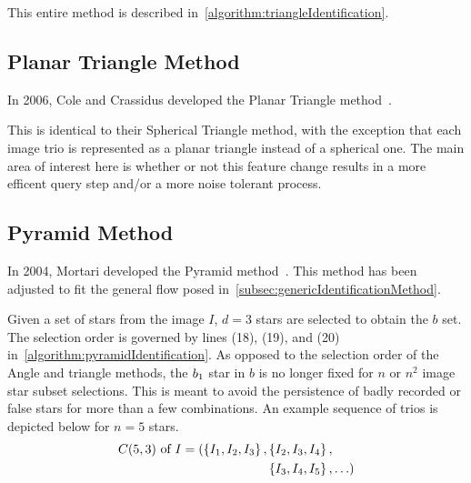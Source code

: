 This entire method is described in~\autoref{algorithm:triangleIdentification}.

\subsection{Planar Triangle Method}\label{subsec:coleAndCrassidus'sPlanarTriangleMethod}
In 2006, Cole and Crassidus developed the Planar Triangle method~\cite{Planar}.

This is identical to their Spherical Triangle method, with the exception that each image trio is represented as a
planar triangle instead of a spherical one.
The main area of interest here is whether or not this feature change results in a more efficent query step and/or
a more noise tolerant process.

\subsection{Pyramid Method}\label{subsec:pyramidMethod}
In 2004, Mortari developed the Pyramid method~\cite{Pyramid,AnalysisUncompensated}.
This method has been adjusted to fit the general flow posed in~\autoref{subsec:genericIdentificationMethod}.

Given a set of stars from the image $I$, $d = 3$ stars are selected to obtain the $b$ set.
The selection order is governed by lines (18), (19), and (20) in~\autoref{algorithm:pyramidIdentification}.
As opposed to the selection order of the Angle and triangle methods, the $b_1$ star in $b$ is no longer fixed
for $n$ or $n^2$ image star subset selections.
This is meant to avoid the persistence of badly recorded or false stars for more than a few combinations.
An example sequence of trios is depicted below for $n = 5$ stars.
\begin{equation}
    \begin{aligned}
        C(5, 3) \text{ of } I = ( \left\{ I_1, I_2, I_3 \right\}, &\left\{ I_2, I_3, I_4 \right\}, \\
        &\left\{ I_3, I_4, I_5 \right\}, \ldots )
    \end{aligned}
\end{equation}

